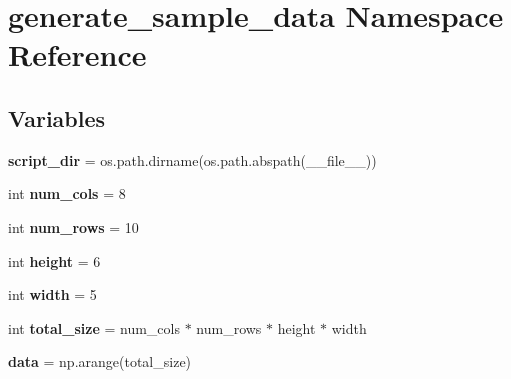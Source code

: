 \hypertarget{namespacegenerate__sample__data}{}\section{generate\+\_\+sample\+\_\+data Namespace Reference}
\label{namespacegenerate__sample__data}
\subsection*{Variables}
\begin{DoxyCompactItemize}
\item 
\mbox{\label{namespacegenerate__sample__data_ae100a26d88fb69bbc7f2b757bba788d8}} 
{\bfseries script\+\_\+dir} = os.\+path.\+dirname(os.\+path.\+abspath(\+\_\+\+\_\+file\+\_\+\+\_\+))
\item 
\mbox{\label{namespacegenerate__sample__data_ae385e421659f38a5027eca2e6f52ff84}} 
int {\bfseries num\+\_\+cols} = 8
\item 
\mbox{\label{namespacegenerate__sample__data_a7891bb56736b704a38633c52ea18fa63}} 
int {\bfseries num\+\_\+rows} = 10
\item 
\mbox{\label{namespacegenerate__sample__data_a020eed012863e9dd0581a34c737b0939}} 
int {\bfseries height} = 6
\item 
\mbox{\label{namespacegenerate__sample__data_a136d420fd3b8bc01fe652575f65210f9}} 
int {\bfseries width} = 5
\item 
\mbox{\label{namespacegenerate__sample__data_ae56c773eb88ec9b0140edbba179bcb06}} 
int {\bfseries total\+\_\+size} = num\+\_\+cols $\ast$ num\+\_\+rows $\ast$ height $\ast$ width
\item 
\mbox{\label{namespacegenerate__sample__data_a4d17760544ae427f4982b979686ae4f8}} 
{\bfseries data} = np.\+arange(total\+\_\+size)
\item 
\mbox{\label{namespacegenerate__sample__data_a35a6940d8b9aff2fc92b84db11b9dd6b}} 

\end{DoxyCompactItemize}
